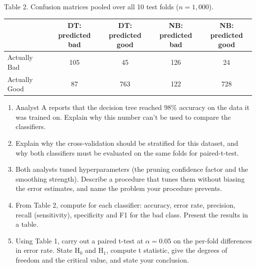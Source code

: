 \documentclass[12pt,letterpaper, onecolumn]{exam}
\begin{document}
\begin{questions}
    Table 2. Confusion matrices pooled over all 10 test folds ($n = 1{,}000$).
    {\small
        \begin{longtable}{|l|c|c|c|c|}
            \hline  & \shortstack{DT: predicted\\bad} & \shortstack{DT: predicted\\good} & \shortstack{NB: predicted\\bad} & \shortstack{NB: predicted\\good} \\ \hline
            \endhead
            \hline
            \endfoot
            Actually Bad & 105 & 45 & 126 & 24 \\
            Actually Good & 87 & 763 &  122 & 728
        \end{longtable}
        }
        \begin{enumerate}[1.]
            \item Analyst A reports that the decision tree reached 98$\%$ accuracy on the data it was trained on. Explain why this number can't be used to compare the classifiers.
            \item Explain why the cross-validation should be stratified for this dataset, and why both classifiers must be evaluated on the same folds for paired-t-test.
            \item Both analysts tuned hyperparameters (the pruning confidence factor and the smoothing strength). Describe a procedure that tunes them without biasing the error estimates, and name the problem your procedure prevents.
            \item From Table 2, compute for each classifier: accuracy, error rate, precision, recall (sensitivity), specificity and F1 for the bad class. Present the results in a table.
            \item Using Table 1, carry out a paired t-test at $\alpha = 0.05$ on the per-fold differences in error rate. State H$_0$ and H$_1$, compute t statistic, give the degrees of freedom and the critical value, and state your conclusion.
        \end{enumerate}

    \newpage
    \begin{solution}


\end{solution}
\end{questions}
\end{document}
